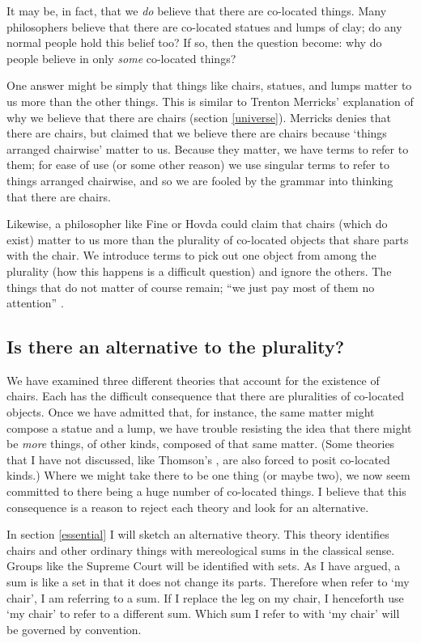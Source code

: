 \documentclass[11pt]{article}
\begin{document}
\begin{spacing}{1.5}
It may be, in fact, that we {\em do} believe that there are co-located
things.  Many philosophers believe that there are co-located statues
and lumps of clay; do any normal people hold this belief too?
If so, then the question become: why do people believe in only {\em
  some} co-located things?

One answer might be simply that things like chairs, statues, and lumps
matter to us more than the other things.  This is similar to Trenton
Merricks' explanation of why we believe that there are chairs (section
\ref{universe}).  Merricks denies that there are chairs, but claimed
that we believe there are chairs because `things arranged chairwise'
matter to us.  Because they matter, we have terms to refer to them;
for ease of use (or some other reason) we use singular terms to refer
to things arranged chairwise, and so we are fooled by the grammar into
thinking that there are chairs.

Likewise, a philosopher like Fine or Hovda could claim that chairs
(which do exist) matter to us more than the plurality of co-located
objects that share parts with the chair.  We introduce terms to pick
out one object from among the plurality (how this happens is a
difficult question) and ignore the others.  The things that do not
matter of course remain; ``we just pay most of them no attention''
\citep[356]{bennett2004}.

\subsection{Is there an alternative to the plurality?}
We have examined three different theories that account for the
existence of chairs.  Each has the difficult consequence that there
are pluralities of co-located objects.  Once we have admitted that,
for instance, the same matter might compose a statue and a lump, we
have trouble resisting the idea that there might be {\em more} things,
of other kinds, composed of that same matter.  (Some theories that I
have not discussed, like Thomson's \citeyearpar{thomson1998a}, are
also forced to posit co-located kinds.)  Where we might take there to
be one thing (or maybe two), we now seem committed to there being a
huge number of co-located things.  I believe that this consequence is
a reason to reject each theory and look for an alternative.

In section \ref{essential} I will sketch an alternative theory.  This
theory identifies chairs and other ordinary things with mereological
sums in the classical sense.  Groups like the Supreme Court will be
identified with sets.  As I have argued, a sum is like a set in that
it does not change its parts.  Therefore when refer to `my chair', I
am referring to a sum.  If I replace the leg on my chair, I henceforth
use `my chair' to refer to a different sum.  Which sum I refer to with
`my chair' will be governed by convention.

\ifstandalone
\end{spacing}


\fi
\end{document}
